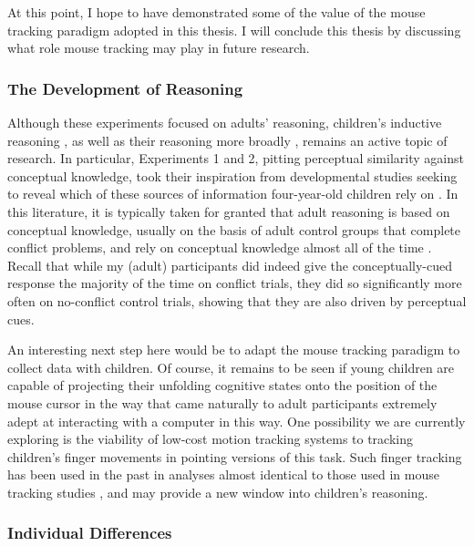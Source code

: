 At this point, I hope to have demonstrated
some of the value of the mouse tracking paradigm
adopted in this thesis.
I will conclude this thesis
by discussing what role mouse tracking may play in future research.

\subsubsection{The Development of Reasoning}

Although these experiments focused on adults' reasoning,
children's inductive reasoning \citep{Gelman2013c,Bright2014,Sloutsky2007},
as well as their reasoning more broadly \citep{OConnor2012,Steegen2012,Handley2004},
remains an active topic of research.
In particular, Experiments 1 and 2,
pitting perceptual similarity against conceptual knowledge,
took their inspiration from developmental studies
seeking to reveal which of these sources of information four-year-old children rely on
\citep{Gelman2013c,Gelman1986,Sloutsky2007}.
In this literature, it is typically taken for granted
that adult reasoning is based on conceptual knowledge,
usually on the basis of adult control groups
that complete conflict problems,
and rely on conceptual knowledge almost all of the time
\citep[e.g.][]{Gelman2013c}.
Recall that while my (adult) participants did indeed
give the conceptually-cued response the majority of the time on conflict trials,
they did so significantly more often on no-conflict control trials,
showing that they are also driven by perceptual cues.

An interesting next step here would be to
adapt the mouse tracking paradigm to collect data with children.
Of course, it remains to be seen if
young children are capable of projecting their unfolding cognitive states
onto the position of the mouse cursor
in the way that came naturally to adult participants
extremely adept at interacting with a computer in this way.
One possibility we are currently exploring
is the viability of low-cost motion tracking systems
to tracking children's finger movements
in pointing versions of this task.
Such finger tracking has been used in the past
in analyses almost identical to those used in mouse tracking studies
\citep[e.g.][]{Song2008,Song2008a,Song2006},
and may provide a new window into children's reasoning.


\subsubsection{Individual Differences}\label{subsec:ch7-ids}

